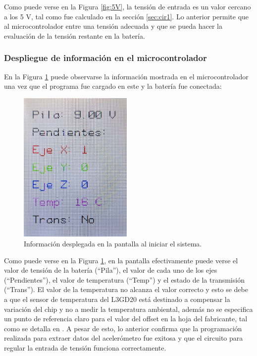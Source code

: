 Como puede verse en la Figura \ref{fig:5V}, la tensión de entrada es un valor cercano a los 5 V, tal como fue calculado en la sección \ref{sec:cir1}. Lo anterior permite que al microcontrolador entre una tensión adecuada y que se pueda hacer la evaluación de la tensión restante en la batería. 

\subsubsection{Despliegue de información en el microcontrolador}
En la Figura \ref{fig:STMa} puede observarse la información mostrada en el microcontrolador una vez que el programa fue cargado en este y la batería fue conectada:

\begin{figure}[H]
\centering
\includegraphics[width=55mm]{./Figuras/Desarrollo_Analisis/STMa}
\caption{Información desplegada en la pantalla al iniciar el sistema.} 
\label{fig:STMa}
\end{figure}

Como puede verse en la Figura \ref{fig:STMa}, en la pantalla efectivamente puede verse el valor de tensión de la batería (``Pila''), el valor de cada uno de los ejes (``Pendientes''), el valor de temperatura (``Temp'') y el estado de la transmisión (``Trans''). El valor de la temperatura no alcanza el valor correcto y esto se debe a que el sensor de temperatura del L3GD20 está destinado a compensar la variación del chip y no a medir la temperatura ambiental, además no se especifica un punto de referencia claro para el valor del offset en la hoja del fabricante, tal como se detalla en \cite{ADA}. A pesar de esto, lo anterior confirma que la programación realizada para extraer datos del acelerómetro fue exitosa y que el circuito para regular la entrada de tensión funciona correctamente.  

